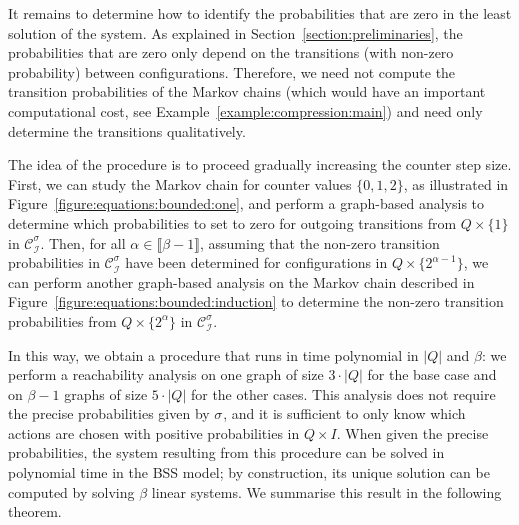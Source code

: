 \documentclass[a4paper,UKenglish,cleveref,autoref,thm-restate,colorlinks]{lipics-v2021}
\newcommand{\integerInterval}[1]{\llbracket{}#1\rrbracket{}}
\newcommand{\ocStateSpace}{Q}
\newcommand{\mchain}{\mathcal{C}}
\newcommand{\intPart}{\mathcal{I}}
\newcommand{\interval}{I}
\newcommand{\powerIndex}{\alpha}
\newcommand{\powerMax}{\beta}
\newcommand{\compressChainStrat}[1]{\mchain^{#1}_{\intPart}}
\newcommand{\compressChain}{\compressChainStrat{\strat}}
\newcommand{\stratGeneric}[1]{{\sigma_{#1}}}
\newcommand{\strat}{\stratGeneric{}}
\begin{document}
It remains to determine how to identify the probabilities that are zero in the least solution of the system.
As explained in Section~\ref{section:preliminaries}, the probabilities that are zero only depend on the transitions (with non-zero probability) between configurations.
Therefore, we need not compute the transition probabilities of the Markov chains (which would have an important computational cost, see Example~\ref{example:compression:main}) and need only determine the transitions qualitatively.

The idea of the procedure is to proceed gradually increasing the counter step size.
First, we can study the Markov chain for counter values $\{0, 1, 2\}$, as illustrated in Figure~\ref{figure:equations:bounded:one}, and perform a graph-based analysis to determine which probabilities to set to zero for outgoing transitions from $\ocStateSpace\times\{1\}$ in $\compressChain$.
Then, for all $\powerIndex\in\integerInterval{\powerMax-1}$, assuming that the non-zero transition probabilities in $\compressChain$ have been determined for configurations in $\ocStateSpace\times\{2^{\powerIndex-1}\}$, we can perform another graph-based analysis on the Markov chain described in Figure~\ref{figure:equations:bounded:induction} to determine the non-zero transition probabilities from $\ocStateSpace\times\{2^\powerIndex\}$ in $\compressChain$.

In this way, we obtain a procedure that runs in time polynomial in $|\ocStateSpace|$ and $\powerMax$: we perform a reachability analysis on one graph of size $3\cdot|\ocStateSpace|$ for the base case and on $\powerMax-1$ graphs of size $5\cdot|\ocStateSpace|$ for the other cases.
This analysis does not require the precise probabilities given by $\strat$, and it is sufficient to only know which actions are chosen with positive probabilities in $\ocStateSpace\times\interval$.
When given the precise probabilities, the system resulting from this procedure can be solved in polynomial time in the BSS model; by construction, its unique solution can be computed by solving $\powerMax$ linear systems.
We summarise this result in the following theorem.
\end{document}
